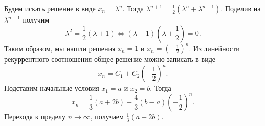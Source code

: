 \documentclass{article}
\begin{document}
Будем искать решение в виде $x_n = \lambda^n$. Тогда $\lambda^{n+1} = \frac12 (\lambda^n + \lambda^{n-1})$. Поделив на $\lambda^{n-1}$ получим
$$\lambda^2 = \frac12 (\lambda + 1) \Leftrightarrow (\lambda -1)(\lambda + \frac12) = 0.$$
Таким образом, мы нашли решения $x_n=1$ и $x_n = \left( -\frac12 \right)^n$. Из линейности рекуррентного соотношения общее решение можно записать в виде $$x_n = C_1 + C_2 \left(-\frac12 \right)^n.$$
Подставим начальные условия $x_1=a$ и $x_2=b$. Тогда
$$x_n = \frac13 (a+2b) + \frac43 (b-a) \left( -\frac12 \right)^n.$$
Переходя к пределу $n \to \infty$, получаем $\frac13 (a+2b)$.
\end{document}
